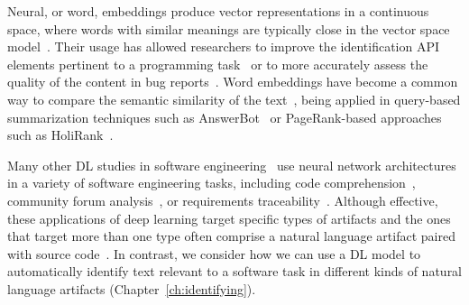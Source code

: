 Neural, or word, embeddings produce vector representations in a continuous space,
where words with similar meanings are typically close in the vector space model~\cite{harris1954distributional, mikolov2013efficient}. 
Their usage has allowed researchers to improve 
the identification API elements pertinent to a programming task~\cite{Ye2016} 
or to more accurately assess the quality of the content in bug reports~\cite{chaparro2019}.
Word embeddings have become a common way 
to compare the semantic similarity of the text~\cite{mihalcea2006},
being applied in query-based summarization techniques such as 
AnswerBot~\cite{Xu2017}
or PageRank-based approaches such as HoliRank~\cite{Ponzanelli2017}.



Many other \acs{DL} studies in software engineering~\cite{ferreira2021,li2018deep, watson2022}
use neural network architectures 
in a variety of software engineering tasks, including
code comprehension~\cite{allamanis2015, mi2018}, 
community forum analysis~\cite{Lin2018, wang2019}, 
or requirements traceability~\cite{chen2019, guo2017}.
Although effective, these applications of deep learning
target specific
types of artifacts and the ones 
that target more than one type 
often comprise a natural language artifact 
paired with source code~\cite{watson2022}. 
In contrast, 
we consider how we can use a \acs{DL}
model to automatically 
identify text relevant to a software task
in different kinds of natural language artifacts (Chapter~\ref{ch:identifying}).

